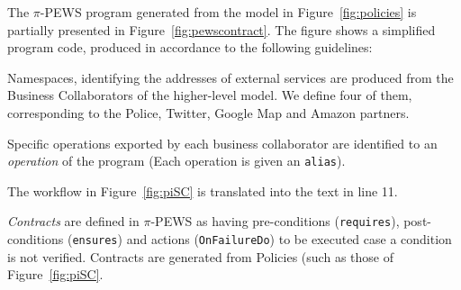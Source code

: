 The $\pi$-PEWS program generated from the model in Figure~\ref{fig:policies} is partially presented in Figure~\ref{fig:pewscontract}. 
The figure shows a simplified program code, produced in accordance to the following guidelines:
\begin{numtrivlist}
\item Namespaces, identifying the addresses of external services are produced from the Business Collaborators of the higher-level model. 
We define four of them, corresponding to the Police, Twitter, Google Map and Amazon partners.
\item Specific operations exported by each business collaborator are identified to an \textit{operation} of the program (Each operation is given an \texttt{alias}).
\item The workflow in Figure~\ref{fig:piSC} is translated into the text in line 11.
\item \textit{Contracts} are defined in $\pi$-PEWS as having pre-conditions (\texttt{requires}), post-conditions (\texttt{ensures}) and actions (\texttt{OnFailureDo}) to be executed case a condition is not verified. 
Contracts are generated from Policies (such as those of Figure~\ref{fig:piSC}.
\end{numtrivlist}



